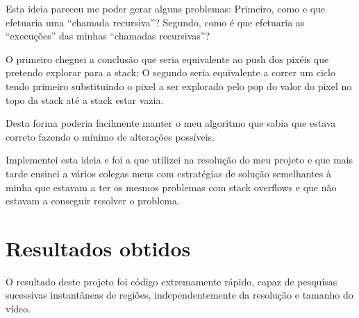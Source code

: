 \documentclass{article}
\begin{document}
Esta ideia pareceu me poder gerar alguns problemas: Primeiro, como e que efetuaria uma “chamada recursiva”? Segundo, como é que efetuaria as “execuções” das minhas “chamadas recursivas”?

O primeiro cheguei a conclusão que seria equivalente ao push dos pixéis que pretendo explorar para a stack; O segundo seria equivalente a correr um ciclo tendo primeiro substituindo o pixel a ser explorado pelo pop do valor do pixel no topo da stack até a stack estar vazia.

Desta forma poderia facilmente manter o meu algoritmo que sabia que estava correto fazendo o mínimo de alterações possíveis.

Implementei esta ideia e foi a que utilizei na resolução do meu projeto e que mais tarde ensinei a vários colegas meus com estratégias de solução semelhantes à minha que estavam a ter os mesmos problemas com stack overflows e que não estavam a conseguir resolver o problema.

\section{Resultados obtidos}

O resultado deste projeto foi código extremamente rápido, capaz de pesquisas sucessivas instantâneas de regiões, independentemente da resolução e tamanho do vídeo.
\end{document}
